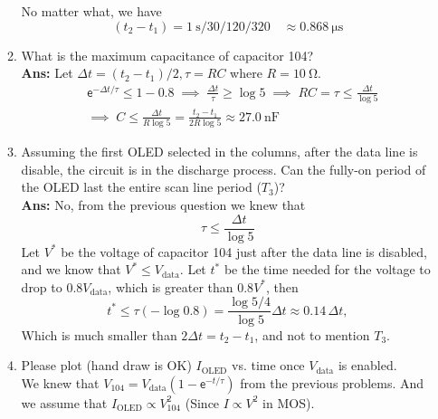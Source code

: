 \documentclass[12pt, a4paper]{article}
\newcommand{\ex}{\mathsf{e}}
\begin{document}
\begin{enumerate}[label={\arabic*.}, leftmargin=0pt]
\begin{enumerate}[label={(\alph*)}]
        No matter what, we have
        \[ (t_2 - t_1) = \SI{1}\s / 30 / 120 / 320 \quad \approx \SI{0.868}\us \]

      \item What is the maximum capacitance of capacitor 104? \\
        {\bf Ans: } Let $\Delta t = (t_2 - t_1)/2, \tau = RC$ where $R = \SI{10}\ohm$.
        \begin{align*}
          & \ex^{-\Delta t/\tau} \leq 1 - 0.8 \; \implies \; \frac{\Delta t}{\tau} \geq \log 5 
          \; \implies \; RC = \tau \leq \frac{\Delta t}{\log 5} \\
          & \implies \; C \leq \frac{\Delta t}{R \log 5} 
          = \frac{t_2 - t_1}{2 R \log 5} \approx \SI{27.0}{\nano\farad} 
        \end{align*}

      \item Assuming the first OLED selected in the columns, after the data line 
        is disable, the circuit is in the discharge process.   Can the fully-on 
        period of the OLED last the entire scan line period ($T_3$)? \\
        {\bf Ans: } No, from the previous question we knew that
        \[ \tau \leq \frac{\Delta t}{\log 5} \]
        Let $V^*$ be the voltage of capacitor 104 just after the data line is disabled, and
        we know that $V^* \leq V_{\text{data}}$.
        Let $t^*$ be the time needed for the voltage to drop to $0.8 V_{\text{data}}$, which
        is greater than $0.8 V^*$, then
        \[ t^* \leq \tau (- \log 0.8) = \frac{\log 5/4}{\log 5} \Delta t \approx 0.14 \,\Delta t, \]
        Which is much smaller than $2 \Delta t = t_2 - t_1$, and not to mention $T_3$.
      \item Please plot (hand draw is OK) $I_{\text{OLED}}$ vs. time once 
        $V_{\text{data}}$ is enabled. \\
        We knew that $V_{104} = V_{\text{data}} (1 - \ex^{-t/\tau})$ from the previous problems.
        And we assume that $I_{\text{OLED}} \propto V_{104}^2 $ (Since $I \propto V^2$ in MOS).
        \begin{figure}[H]
          \centering
      \end{figure}
    \end{enumerate}

\end{enumerate}
\end{document}
